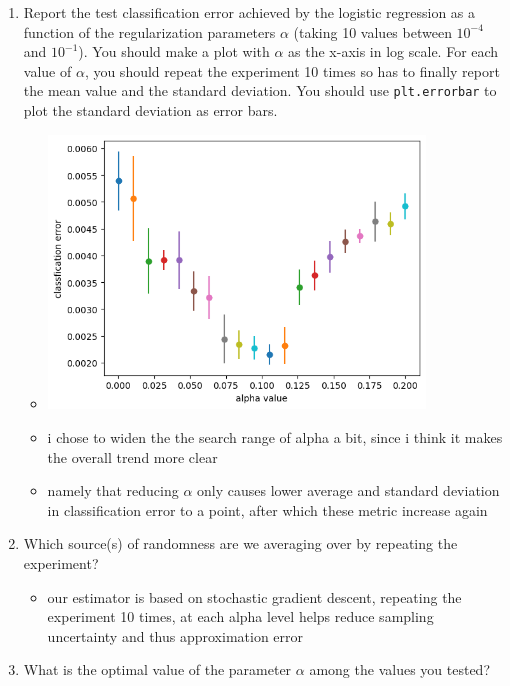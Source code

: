 \documentclass{article}
\begin{document}
\begin{enumerate}
\setcounter{enumi}{\value{saveenum}}
  \item Report the test classification error achieved by the logistic regression as a function of the regularization parameters $\alpha$ (taking 10 values between $10^{-4}$ and $10^{-1}$). You should make a plot with $\alpha$ as the x-axis in log scale. For each value of $\alpha$, you should repeat the experiment 10 times so has to finally report the mean value and the standard deviation. You should use \texttt{plt.errorbar} to plot the standard deviation as error bars.

  \begin{itemize}
      \item \includegraphics[width=10cm]{homework/homework_2/immages/29_1.png}
      \item i chose to widen the the search range of alpha a bit, since i think it makes the overall trend more clear
      \item namely that reducing $\alpha$ only causes lower average and standard deviation in classification error to a point, after which these metric increase again
  \end{itemize}
  
  \item Which source(s) of randomness are we averaging over by repeating the experiment?
\begin{itemize}
    \item our estimator is based on stochastic gradient descent, repeating the experiment 10 times, at each alpha level helps reduce sampling uncertainty and thus approximation error
\end{itemize}
  
  \item What is the optimal value of the parameter $\alpha$ among the values you tested? 


\end{enumerate}
\end{document}

